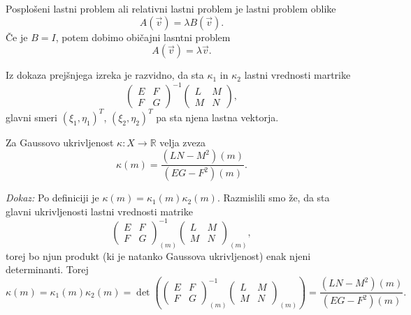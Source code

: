 \begin{definicija}
\label{def_posploseni_lastni_problem}
 Posplošeni lastni problem ali relativni lastni problem je lastni problem oblike \begin{equation*}
   A(\vec{v}) = \lambda B(\vec{v}).
 \end{equation*}  
  Če je $B = I$, potem dobimo običajni lasntni problem \begin{equation*}
    A(\vec{v}) = \lambda \vec{v}.
  \end{equation*}  
\end{definicija}

Iz dokaza prejšnjega izreka je razvidno, da sta $\kappa_1$ in $\kappa_2$ lastni vrednosti martrike \begin{equation*}
  \begin{pmatrix}
  E & F \\
  F & G
  \end{pmatrix}^{-1}\begin{pmatrix}
  L & M \\
  M & N
  \end{pmatrix},
\end{equation*}  
  glavni smeri $(\xi_1, \eta_1)^{T}$, $(\xi_2, \eta_2)^{T}$ pa sta njena lastna vektorja.


\begin{izrek}
\label{izr_izrazava_gaussove_ukrivljenosti}
Za Gaussovo ukrivljenost $\kappa: X \to  \mathbb{R}$ velja zveza \begin{equation*}
\kappa(m) = \frac{(LN - M^2)(m)}{(EG - F^2)(m)}. 
\end{equation*}  
\end{izrek}

\noindent
{\em Dokaz:\/}
Po definiciji je $\kappa(m) = \kappa_1(m) \kappa_2(m)$. Razmislili smo že, da sta glavni ukrivljenosti
lastni vrednosti matrike \begin{equation*}
  \begin{pmatrix}
    E & F \\
    F & G
    \end{pmatrix}_{(m)}^{-1}\begin{pmatrix}
    L & M \\
    M & N
    \end{pmatrix}_{(m)},
\end{equation*}  
  torej bo njun produkt (ki je natanko Gaussova ukrivljenost) enak njeni determinanti. Torej \begin{equation*}
    \kappa(m) = \kappa_1(m) \kappa_2(m) = \det \left(  \begin{pmatrix}
      E & F \\
      F & G
      \end{pmatrix}_{(m)}^{-1}\begin{pmatrix}
      L & M \\
      M & N
      \end{pmatrix}_{(m)} \right) = \frac{(LN - M^2)(m)}{(EG - F^2)(m)}.
  \end{equation*}  
    
